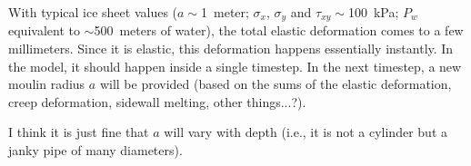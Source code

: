 \documentclass[11pt]{article}
\begin{document}
With typical ice sheet values ($a\sim$1~meter; $\sigma_{x}$, $\sigma_y$ and $\tau_{xy}\sim$100~kPa; $P_w$ equivalent to $\sim$500~meters of water), the total elastic deformation comes to a few millimeters.  Since it is elastic, this deformation happens essentially instantly.  In the model, it should happen inside a single timestep.  In the next timestep, a new moulin radius $a$ will be provided (based on the sums of the elastic deformation, creep deformation, sidewall melting, other things...?).

I think it is just fine that $a$ will vary with depth (i.e., it is not a cylinder but a janky pipe of many diameters).
\end{document}
